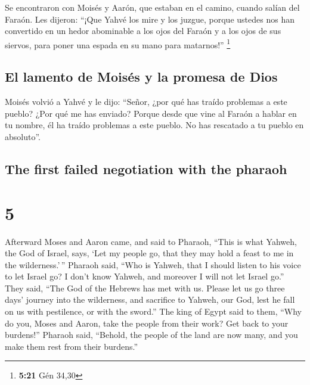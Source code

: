 \begin{paracol}{2}
 Se encontraron con Moisés y Aarón, que estaban en el
camino, cuando salían del Faraón.  Les dijeron: ``¡Que
Yahvé los mire y los juzgue, porque ustedes nos han convertido en un
hedor abominable a los ojos del Faraón y a los ojos de sus siervos, para
poner una espada en su mano para matarnos!'' \footnote{\textbf{5:21} Gén
  34,30}

\hypertarget{el-lamento-de-moisuxe9s-y-la-promesa-de-dios}{%
\subsection{El lamento de Moisés y la promesa de
Dios}\label{el-lamento-de-moisuxe9s-y-la-promesa-de-dios}}

 Moisés volvió a Yahvé y le dijo: ``Señor, ¿por qué has
traído problemas a este pueblo? ¿Por qué me has enviado? 
Porque desde que vine al Faraón a hablar en tu nombre, él ha traído
problemas a este pueblo. No has rescatado a tu pueblo en absoluto''.

\switchcolumn
\begin{otherlanguage}{english}

\hypertarget{the-first-failed-negotiation-with-the-pharaoh}{%
\subsection{The first failed negotiation with the
pharaoh}\label{the-first-failed-negotiation-with-the-pharaoh}}

\hypertarget{section-9}{%
\section{5}\label{section-9}}

 Afterward Moses and Aaron came, and said to Pharaoh,
``This is what Yahweh, the God of Israel, says, `Let my people go, that
they may hold a feast to me in the wilderness.'\,'' 
Pharaoh said, ``Who is Yahweh, that I should listen to his voice to let
Israel go? I don't know Yahweh, and moreover I will not let Israel go.''
 They said, ``The God of the Hebrews has met with us.
Please let us go three days' journey into the wilderness, and sacrifice
to Yahweh, our God, lest he fall on us with pestilence, or with the
sword.''  The king of Egypt said to them, ``Why do you,
Moses and Aaron, take the people from their work? Get back to your
burdens!''  Pharaoh said, ``Behold, the people of the land
are now many, and you make them rest from their burdens.''


\end{otherlanguage}
\end{paracol}
